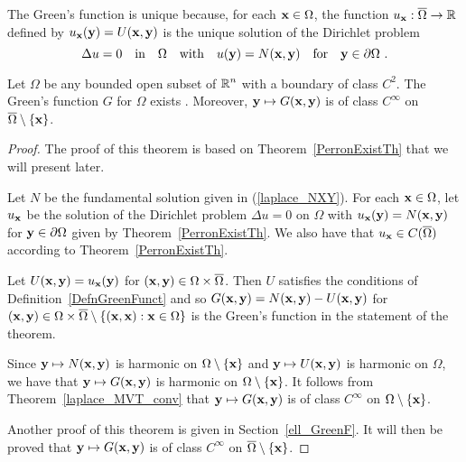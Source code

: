 The Green's function is unique because, for each $\mathbf{x} \in \Omega$,
the function $u_{\mathbf{x}}:\overline{\Omega}\rightarrow \mathbb{R}$ defined by
$u_{\mathbf{x}}(\mathbf{y}) = U(\mathbf{x},\mathbf{y})$ is the unique
solution of the Dirichlet problem
\begin{equation} \label{laplace_RefGFDP}
\Delta u = 0 \quad \text{in} \quad \Omega \quad
\text{with} \quad u(\mathbf{y}) = N(\mathbf{x},\mathbf{y}) \quad
\text{for} \quad \mathbf{y}\in \partial \Omega \ .
\end{equation}

\begin{theorem} \label{laplace_GreenExist}
Let $\Omega$ be any bounded open subset of $\displaystyle \mathbb{R}^n$ with
a boundary of class $\displaystyle C^2$.  The Green's function $G$ for
$\Omega$ exists \footnotemark.  Moreover,
$\mathbf{y} \mapsto G(\mathbf{x},\mathbf{y})$ is of class
$\displaystyle C^\infty$ on $\overline{\Omega} \setminus \{\mathbf{x}\}$.
\end{theorem}


\begin{proof}
The proof of this theorem is based on Theorem~\ref{PerronExistTh} that
we will present later.
  
Let $N$ be the fundamental solution given in (\ref{laplace_NXY}).
For each $\mathbf{x} \in \Omega$, let $u_{\mathbf{x}}$ be the
solution of the Dirichlet problem $\Delta u = 0$ on $\Omega$ with
$u_{\mathbf{x}}(\mathbf{y}) = N(\mathbf{x},\mathbf{y})$ for $\mathbf{y} \in \partial \Omega$
given by Theorem~\ref{PerronExistTh}.  We also have that
$\displaystyle u_{\mathbf{x}} \in C(\overline{\Omega})$
according to Theorem~\ref{PerronExistTh}.

Let $U(\mathbf{x},\mathbf{y}) = u_{\mathbf{x}}(\mathbf{y})$ for
$(\mathbf{x},\mathbf{y}) \in \Omega \times \overline{\Omega}$.  Then
$U$ satisfies the conditions of Definition~\ref{DefnGreenFunct} and so
$G(\mathbf{x},\mathbf{y}) = N(\mathbf{x},\mathbf{y}) - U(\mathbf{x},\mathbf{y})$
for $(\mathbf{x},\mathbf{y}) \in \Omega \times \overline{\Omega}
\setminus \{ (\mathbf{x},\mathbf{x}) : \mathbf{x} \in \Omega \}$
is the Green's function in the statement of the theorem.

Since $\mathbf{y} \mapsto N(\mathbf{x},\mathbf{y})$ is harmonic on
$\Omega \setminus \{\mathbf{x}\}$ and
$\mathbf{y} \mapsto U(\mathbf{x},\mathbf{y})$ is harmonic on $\Omega$, we have
that $\mathbf{y} \mapsto G(\mathbf{x},\mathbf{y})$ is harmonic on 
$\Omega \setminus \{\mathbf{x}\}$.  It follows from
Theorem~\ref{laplace_MVT_conv} that $\mathbf{y} \mapsto G(\mathbf{x},\mathbf{y})$
is of class $\displaystyle C^\infty$ on $\Omega \setminus \{\mathbf{x}\}$.

Another proof of this theorem is given in Section~\ref{ell_GreenF}.
It will then be proved that $\mathbf{y} \mapsto G(\mathbf{x},\mathbf{y})$ is of class
$\displaystyle C^\infty$ on $\overline{\Omega} \setminus \{\mathbf{x}\}$.
\end{proof}

